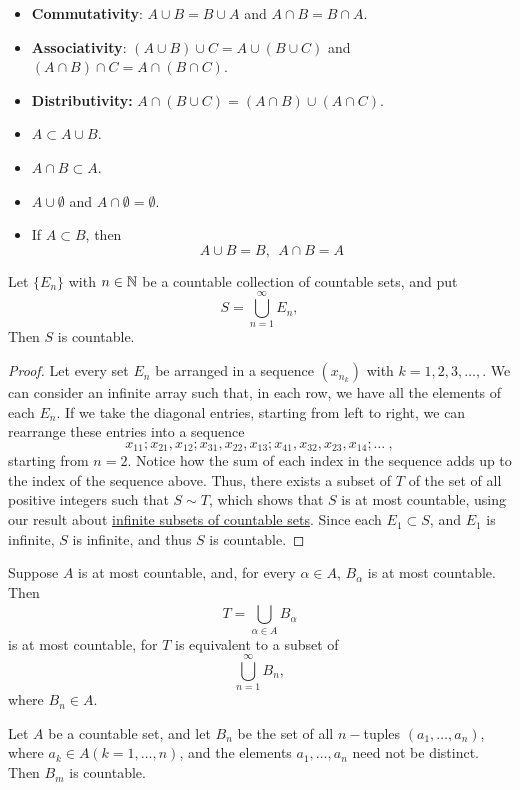 \documentclass[11pt,a4paper]{book}
\begin{document}
\begin{itemize}
    \item \textbf{Commutativity}: \( A \cup B = B \cup A   \) and \( A \cap B = B \cap A  \).
    \item \textbf{Associativity}: \( (A \cup B) \cup C = A \cup (B \cup C)  \) and \(  (A \cap B ) \cap C = A \cap (B \cap C) \).
    \item \textbf{Distributivity:} \( A \cap (B \cup C) = (A \cap B) \cup (A \cap C) \). 
    \item \( A \subset A \cup B  \).
    \item \( A \cap B \subset A  \).
    \item \( A \cup \emptyset \) and \( A \cap \emptyset = \emptyset \).
    \item If \( A \subset B  \), then
        \[  A \cup B = B, \ \  A \cap B  = A   \]
\end{itemize}

\begin{theorem}[ ]
    Let \( \{ {E}_{n} \}   \) with \( n \in \mathbb{N} \) be a countable collection of countable sets, and put
    \[  S = \bigcup_{ n = 1  }^{ \infty  }  {E}_{n}, \]
    Then \( S  \) is countable.
\end{theorem}
\begin{proof}
Let every set \( {E}_{n} \) be arranged in a sequence \( ({x}_{{n}_{k }}) \) with \( k = 1,2,3, \dots, \). We can consider an infinite array such that, in each row, we have all the elements of each \( {E}_{n} \). If we take the diagonal entries, starting from left to right, we can rearrange these entries into a sequence  
\[  {x}_{11}; {x}_{21}, {x}_{12}; {x}_{31}, {x}_{22}, {x}_{13}; {x}_{41}, {x}_{32}, {x}_{23}, {x}_{14}; \dots \ ,  \]
starting from \( n = 2  \). Notice how the sum of each index in the sequence adds up to the index of the sequence above. Thus, there exists a subset of \( T  \) of the set of all positive integers such that \( S \sim T  \), which shows that \( S  \) is at most countable, using our result about {\hyperref[Infinite subsets of countable sets]{infinite subsets of countable sets}}. Since each \( {E}_{1} \subset S  \), and \( {E}_{1}  \) is infinite, \( S  \) is infinite, and thus \( S  \) is countable.  
\end{proof}

\begin{corollary}
   Suppose \( A  \) is at most countable, and, for every \( \alpha  \in A  \), \( {B}_{\alpha} \) is at most countable. Then
   \[  T = \bigcup_{ \alpha \in A  }^{  }  {B}_{\alpha} \]
   is at most countable, for \( T  \) is equivalent to a subset of
   \[  \bigcup_{ n=1  }^{ \infty   } {B}_{n}, \]
   where \( {B}_{n} \in A  \).
\end{corollary}

\begin{theorem}[ ]
    Let \( A  \) be a countable set, and let \( {B}_{n} \) be the set of all \( n- \)tuples \( ({a}_{1}, \dots , {a}_{n}) \), where \( {a}_{k } \in A (k = 1, \dots, n) \), and the elements \( {a}_{1}, \dots, {a}_{n} \) need not be distinct. Then \( {B}_{m}  \) is countable.
\end{theorem}
\end{document}
